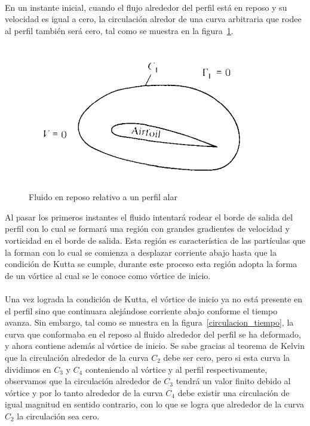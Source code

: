 \documentclass[letterpaper, openright, 12pt]{book}
\begin{document}
    \paragraph*{}
        En un instante inicial, cuando el flujo alrededor del perfil está en
        reposo y su velocidad es igual a cero, la circulación alredor de una
        curva arbitraria que rodee al perfil también será cero, tal como se
        muestra en la figura~\ref{circulacion_reposo}.

        \begin{figure}[htbp!]
            \centering
            \includegraphics[keepaspectratio, width=115mm]{./Imagenes/circulacion_reposo}
            \caption[Fluido en reposo relativo a un perfil alar]{Fluido en
                reposo relativo a un perfil alar\cite{anderson_fundamentals}}
            \label{circulacion_reposo}
        \end{figure}

        Al pasar los primeros instantes el fluido intentará rodear el borde de
        salida del perfil con lo cual se formará una región con grandes
        gradientes de velocidad y vorticidad en el borde de salida. Esta región
        es característica de las partículas que la forman con lo cual se
        comienza a desplazar corriente abajo hasta que la condición de Kutta se
        cumple, durante este proceso esta región adopta la forma de un vórtice
        al cual se le conoce como vórtice de inicio.

    \paragraph*{}
        Una vez lograda la condición de Kutta, el vórtice de inicio ya no está
        presente en el perfil sino que continuara alejándose corriente abajo
        conforme el tiempo avanza. Sin embargo, tal como se muestra en la
        figura~\ref{circulacion_tiempo}, la curva que conformaba en el reposo
        al fluido alrededor del perfil se ha deformado, y ahora contiene además
        al vórtice de inicio. Se sabe gracias al teorema de Kelvin que la
        circulación alrededor de la curva $C_2$ debe ser cero, pero si esta
        curva la dividimos en $C_3$ y $C_4$ conteniendo al vórtice y al perfil
        respectivamente, observamos que la circulación alrededor de $C_3$
        tendrá un valor finito debido al vórtice y por lo tanto alrededor de la
        curva $C_4$ debe existir una circulación de igual magnitud en sentido
        contrario, con lo que se logra que alrededor de la curva $C_2$ la
        circulación sea cero.
\end{document}
